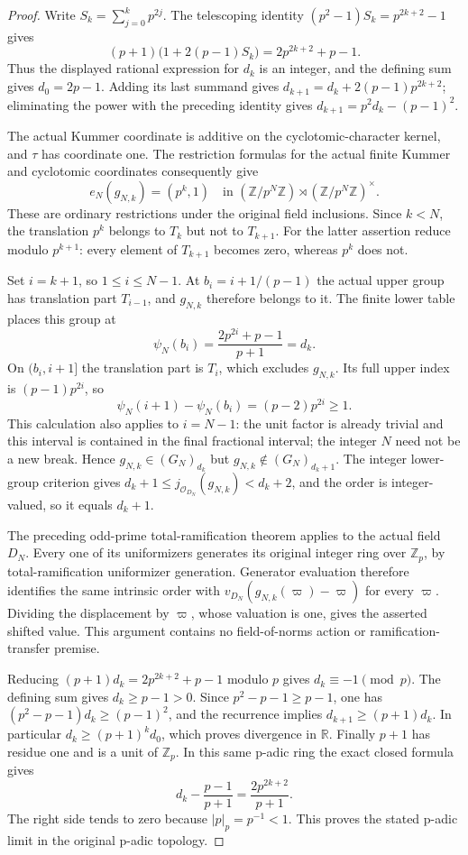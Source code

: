 \begin{proof}
Write $S_k=\sum_{j=0}^{k}p^{2j}$. The telescoping identity
$(p^2-1)S_k=p^{2k+2}-1$ gives
\[
 (p+1)\bigl(1+2(p-1)S_k\bigr)=2p^{2k+2}+p-1.
\]
Thus the displayed rational expression for $d_k$ is an integer, and
the defining sum gives $d_0=2p-1$. Adding its last summand gives
$d_{k+1}=d_k+2(p-1)p^{2k+2}$; eliminating the power with the preceding
identity gives $d_{k+1}=p^2d_k-(p-1)^2$.

The actual Kummer coordinate is additive on the cyclotomic-character
kernel, and $\tau$ has coordinate one. The restriction formulas for
the actual finite Kummer and cyclotomic coordinates consequently give
\[
 e_N(g_{N,k})=(p^k,1)
 \quad\text{in }(\mathbb Z/p^N\mathbb Z)\rtimes
                  (\mathbb Z/p^N\mathbb Z)^\times.
\]
These are ordinary restrictions under the original field inclusions.
Since $k<N$, the translation $p^k$ belongs to $T_k$ but not to
$T_{k+1}$. For the latter assertion reduce modulo $p^{k+1}$:
every element of $T_{k+1}$ becomes zero, whereas $p^k$ does not.

Set $i=k+1$, so $1\leq i\leq N-1$. At
$b_i=i+1/(p-1)$ the actual upper group has translation part $T_{i-1}$,
and $g_{N,k}$ therefore belongs to it. The finite lower table places
this group at
\[
 \psi_N(b_i)=\frac{2p^{2i}+p-1}{p+1}=d_k.
\]
On $(b_i,i+1]$ the translation part is $T_i$, which excludes
$g_{N,k}$. Its full upper index is $(p-1)p^{2i}$, so
\[
 \psi_N(i+1)-\psi_N(b_i)=(p-2)p^{2i}\geq1.
\]
This calculation also applies to $i=N-1$: the unit factor is already
trivial and this interval is contained in the final fractional interval;
the integer $N$ need not be a new break. Hence
$g_{N,k}\in(G_N)_{d_k}$ but $g_{N,k}\notin(G_N)_{d_k+1}$.
The integer lower-group criterion gives
$d_k+1\leq j_{\mathcal O_{D_N}}(g_{N,k})<d_k+2$, and the order is
integer-valued, so it equals $d_k+1$.

The preceding odd-prime total-ramification theorem applies to the actual
field $D_N$. Every one of its uniformizers generates its original
integer ring over $\mathbb Z_p$, by total-ramification uniformizer
generation. Generator evaluation therefore identifies the same
intrinsic order with $v_{D_N}(g_{N,k}(\varpi)-\varpi)$ for every
$\varpi$. Dividing the displacement by $\varpi$, whose valuation is
one, gives the asserted shifted value. This argument contains no
field-of-norms action or ramification-transfer premise.

Reducing $(p+1)d_k=2p^{2k+2}+p-1$ modulo $p$ gives
$d_k\equiv-1\pmod p$. The defining sum gives $d_k\geq p-1>0$.
Since $p^2-p-1\geq p-1$, one has
$(p^2-p-1)d_k\geq(p-1)^2$, and the recurrence implies
$d_{k+1}\geq(p+1)d_k$. In particular $d_k\geq(p+1)^kd_0$, which
proves divergence in $\mathbb R$.
Finally $p+1$ has residue one and is a unit of $\mathbb Z_p$. In this
same p-adic ring the exact closed formula gives
\[
 d_k-\frac{p-1}{p+1}=\frac{2p^{2k+2}}{p+1}.
\]
The right side tends to zero because $|p|_p=p^{-1}<1$. This proves
the stated p-adic limit in the original p-adic topology.
\end{proof}


